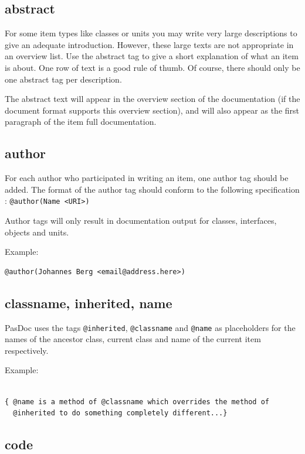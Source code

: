 \documentclass[11pt]{article}
\begin{document}
\subsection{abstract}

For some item types like classes or units you may write very large
descriptions to give an adequate introduction.
However, these large texts are not appropriate in an overview list.
Use the abstract tag to give a short explanation of what an item
is about.
One row of text is a good rule of thumb.
Of course, there should only be one abstract tag per description.

The abstract text will appear in the overview section of the
documentation (if the document format supports this overview section),
and will also appear as the first paragraph of the item full
documentation.

\subsection{author}

For each author who participated in writing an item, one author tag
should be added. The format of the author tag should conform to
the following specification : {\tt @author(Name <URI>)}

Author tags will only result in documentation output for
classes, interfaces, objects and units.

Example:
\begin{verbatim}
@author(Johannes Berg <email@address.here>)
\end{verbatim}

\subsection{classname, inherited, name}

PasDoc uses the tags {\tt @inherited}, {\tt @classname} and {\tt @name} as
placeholders for the names of the ancestor class, current class and name of the
current item respectively.

Example:
\begin{verbatim}

{ @name is a method of @classname which overrides the method of
  @inherited to do something completely different...}
\end{verbatim}

\subsection{code}
\end{document}

